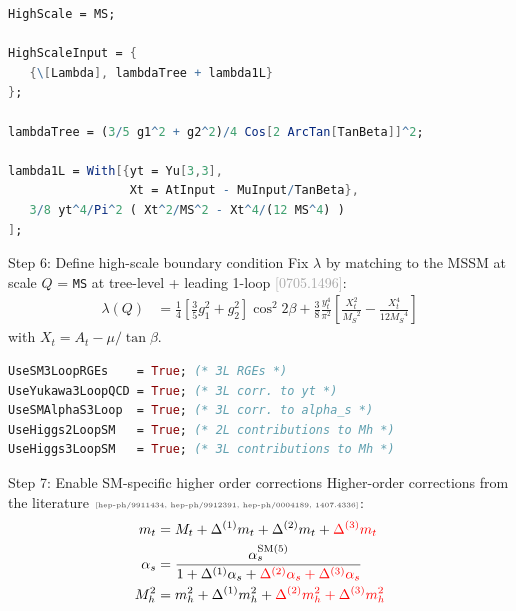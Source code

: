 \documentclass[hyperref={pdfpagelabels=false},ngerman]{beamer}
\newcommand{\MS}{\ensuremath{M_S}}
\newcommand{\mycite}[1]{\ensuremath{\text{\textcolor{darkgray}{\tiny [#1]}}}}
\newcommand{\bigcite}[1]{\textcolor{darkgray}{[#1]}}
\newcommand{\SM}{\ensuremath{\text{SM}}}
\newcommand{\as}{\alpha_s}
\begin{document}
\begin{lrbox}{\listbox}\begin{lstlisting}[language=Mathematica]
HighScale = MS;

HighScaleInput = {
   {\[Lambda], lambdaTree + lambda1L}
};

lambdaTree = (3/5 g1^2 + g2^2)/4 Cos[2 ArcTan[TanBeta]]^2;

lambda1L = With[{yt = Yu[3,3],
                 Xt = AtInput - MuInput/TanBeta},
   3/8 yt^4/Pi^2 ( Xt^2/MS^2 - Xt^4/(12 MS^4) )
];
\end{lstlisting}\end{lrbox}

\begin{frame}{Step 6: Define high-scale boundary condition}
  Fix $\lambda$ by matching to the MSSM at scale
  $Q$ = \texttt{MS} at tree-level + leading 1-loop
  \bigcite{0705.1496}:
  \begin{align*}
    \lambda(Q) &= \frac{1}{4} \left[ \frac{3}{5} g_1^2 + g_2^2 \right] \cos^2 2\beta
    + \frac{3}{8} \frac{y_t^4}{\pi^2}\left[
       \frac{X_t^2}{\MS^2}
       - \frac{X_t^4}{12 \MS^4}
    \right]
  \end{align*}
  with $X_t = A_t - \mu/\tan\beta$.
  \\[1em]
  \usebox{\listbox}
\end{frame}

\begin{lrbox}{\listbox}\begin{lstlisting}[language=Mathematica]
UseSM3LoopRGEs    = True; (* 3L RGEs *)
UseYukawa3LoopQCD = True; (* 3L corr. to yt *)
UseSMAlphaS3Loop  = True; (* 3L corr. to alpha_s *)
UseHiggs2LoopSM   = True; (* 2L contributions to Mh *)
UseHiggs3LoopSM   = True; (* 3L contributions to Mh *)
\end{lstlisting}\end{lrbox}

\begin{frame}{Step 7: Enable SM-specific higher order corrections}
  Higher-order corrections from the literature \mycite{hep-ph/9911434,
    hep-ph/9912391, hep-ph/0004189, 1407.4336}:
  \begin{align*}
    m_t &= M_t + \Delta^{(1)} m_t + \Delta^{(2)} m_t + \textcolor{red}{\Delta^{(3)} m_t} \\
    \alpha_s &= \frac{\alpha_s^{\SM(5)}}{1 + \Delta^{(1)} \as + \textcolor{red}{\Delta^{(2)} \as + \Delta^{(3)} \as}} \\
    M_h^2 &= m_h^2 + \Delta^{(1)} m_h^2 + \textcolor{red}{\Delta^{(2)} m_h^2 + \Delta^{(3)} m_h^2}
  \end{align*}
  \\[1em]
  \usebox{\listbox}
\end{frame}
\end{document}

